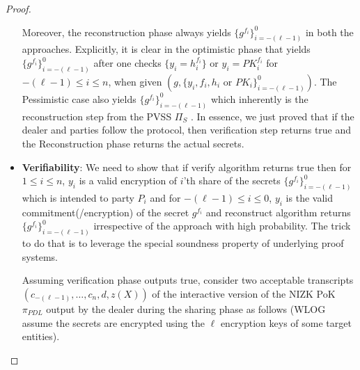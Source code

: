 \begin{proof}
\begin{itemize}
    Moreover, the reconstruction phase always yields $\{g^{f_i}\}_{i=-(\ell-1)}^0$ in both the approaches. Explicitly, it is 
    clear in the optimistic phase that yields $\{g^{f_i}\}_{i=-(\ell-1)}^0$ after one checks $\{y_i=h_i^{f_i}\}$ or $y_i=PK_i^{f_i}$ for $-(\ell-1)\leq i\leq n$,  
    when given $(g,\{y_i,f_i,h_i\text{ or }PK_i\}_{i=-(\ell-1)}^0)$. The Pessimistic case also yields 
    $\{g^{f_i}\}_{i=-(\ell-1)}^0$ which inherently is the reconstruction step from the PVSS $\Pi_S$ \cite{cryptoeprint:2023/1669}. 
    In essence, we just proved that if the dealer and parties follow the protocol, then verification step returns 
    true and the Reconstruction phase returns the actual secrets.

    \item \textbf{Verifiability}: We need to show that if verify algorithm returns true then for $1\leq i\leq n$, 
    $y_i$ is a valid encryption of $i$'th share of the secrets $\{g^{f_i}\}_{i=-(\ell-1)}^0$ which is intended to party $P_i$ and 
    for $-(\ell-1)\leq i\leq 0$, $y_i$ is the valid commitment(/encryption) of the secret $g^{f_i}$ and 
    reconstruct algorithm returns $\{g^{f_i}\}_{i=-(\ell-1)}^0$ irrespective of the approach with high probability. The 
    trick to do that is to leverage the special soundness property of underlying proof systems.\par

    Assuming verification phase outputs true, consider two acceptable transcripts $(c_{-(\ell-1)},\dots,c_n,d,z(X))$ 
    of the interactive version of the NIZK PoK $\pi_{PDL}$ output by the dealer during the sharing phase as 
    follows (WLOG assume the secrets are encrypted using the $\ell$ encryption keys of some target entities).


\end{itemize}
\end{proof}
